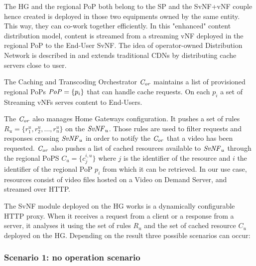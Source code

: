 The HG and the regional PoP both belong to the SP and the SvNF+vNF couple hence created is deployed in those two equipments owned by the same entity. This way, they can co-work together efficiently. In this "enhanced" content distribution model, content is streamed from a streaming vNF deployed in the regional PoP to the End-User SvNF.
The idea of operator-owned Distribution Network is described in \cite{spagna_design_2013} and extends traditional CDNs by distributing cache servers close to user.

The Caching and Transcoding Orchestrator  $\mathit{C_{or}}$ maintains a list of provisioned regional PoPs \(\mathit{PoP}=\{p_{i}\}\) that can handle cache requests. On each $p_{i}$ a set of Streaming vNFs serves content to End-Users.

The $\mathit{C_{or}}$ also manages Home Gateways configuration. It pushes a set of rules \(R_{u}=\{r^{u}_{1},r^{u}_{2},...,r^{u}_{n}\}\) on the $\mathit{SvNF}_{u}$. 
Those rules are used to filter requests and responses crossing $\mathit{SvNF}_{u}$ in order to notify the $\mathit{C_{or}}$ that a video has been requested.
$\mathit{C_{or}}$ also pushes a list of cached resources available to $\mathit{SvNF}_{u}$ through the regional PoPS $C_{u}=\{c^{i,u}_{j} \}$ where $j$ is the identifier of the resource and $i$ the identifier of the regional PoP $p_{i}$ from which it can be retrieved. In our use case, resources consist of video files hosted on a Video on Demand Server, and streamed over HTTP.

The SvNF module deployed on the HG works is a dynamically configurable HTTP proxy.
When it receives a request from a client or a response from a server, it analyses it using the set of rules \(R_{u}\) and the set of cached resource $C_{u}$ deployed on the HG.
Depending on the result three possible scenarios can occur:


\subsubsection*{Scenario 1: no operation scenario}\label{noop}

